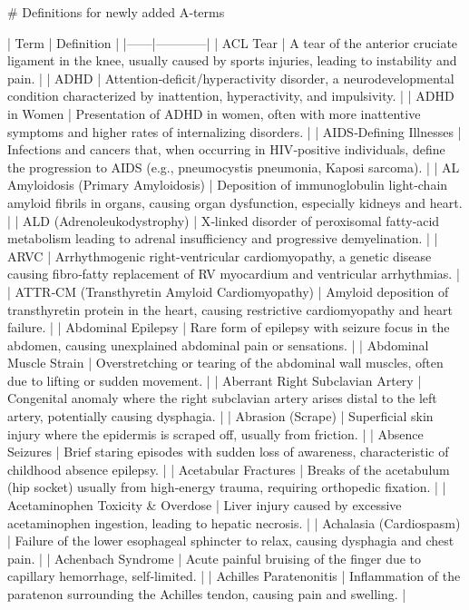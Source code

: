 # Definitions for newly added A‑terms

| Term | Definition |
|------|------------|
| ACL Tear | A tear of the anterior cruciate ligament in the knee, usually caused by sports injuries, leading to instability and pain. |
| ADHD | Attention‑deficit/hyperactivity disorder, a neurodevelopmental condition characterized by inattention, hyperactivity, and impulsivity. |
| ADHD in Women | Presentation of ADHD in women, often with more inattentive symptoms and higher rates of internalizing disorders. |
| AIDS‑Defining Illnesses | Infections and cancers that, when occurring in HIV‑positive individuals, define the progression to AIDS (e.g., pneumocystis pneumonia, Kaposi sarcoma). |
| AL Amyloidosis (Primary Amyloidosis) | Deposition of immunoglobulin light‑chain amyloid fibrils in organs, causing organ dysfunction, especially kidneys and heart. |
| ALD (Adrenoleukodystrophy) | X‑linked disorder of peroxisomal fatty‑acid metabolism leading to adrenal insufficiency and progressive demyelination. |
| ARVC | Arrhythmogenic right‑ventricular cardiomyopathy, a genetic disease causing fibro‑fatty replacement of RV myocardium and ventricular arrhythmias. |
| ATTR‑CM (Transthyretin Amyloid Cardiomyopathy) | Amyloid deposition of transthyretin protein in the heart, causing restrictive cardiomyopathy and heart failure. |
| Abdominal Epilepsy | Rare form of epilepsy with seizure focus in the abdomen, causing unexplained abdominal pain or sensations. |
| Abdominal Muscle Strain | Overstretching or tearing of the abdominal wall muscles, often due to lifting or sudden movement. |
| Aberrant Right Subclavian Artery | Congenital anomaly where the right subclavian artery arises distal to the left artery, potentially causing dysphagia. |
| Abrasion (Scrape) | Superficial skin injury where the epidermis is scraped off, usually from friction. |
| Absence Seizures | Brief staring episodes with sudden loss of awareness, characteristic of childhood absence epilepsy. |
| Acetabular Fractures | Breaks of the acetabulum (hip socket) usually from high‑energy trauma, requiring orthopedic fixation. |
| Acetaminophen Toxicity & Overdose | Liver injury caused by excessive acetaminophen ingestion, leading to hepatic necrosis. |
| Achalasia (Cardiospasm) | Failure of the lower esophageal sphincter to relax, causing dysphagia and chest pain. |
| Achenbach Syndrome | Acute painful bruising of the finger due to capillary hemorrhage, self‑limited. |
| Achilles Paratenonitis | Inflammation of the paratenon surrounding the Achilles tendon, causing pain and swelling. |
